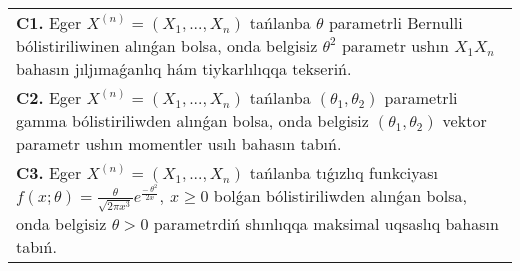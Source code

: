 \documentclass{article}
\begin{document}
\begin{tabular}{m{17cm}}
 \\
\textbf{C1.} 
Eger \(X^{(n)} = \left( X_{1},...,X_{n} \right)\) tańlanba \(\theta\) parametrli Bernulli bólistiriliwinen alınǵan bolsa, onda belgisiz \(\theta^{2}\) parametr ushın \(X_{1}X_{n}\) bahasın jıljımaǵanlıq hám tiykarlılıqqa tekseriń.
 \\
\textbf{C2.} 
Eger \(X^{(n)} = \left( X_{1},...,X_{n} \right)\) tańlanba \(\left( \theta_{1},\theta_{2} \right)\) parametrli gamma bólistiriliwden alınǵan bolsa, onda belgisiz \(\left( \theta_{1},\theta_{2} \right)\) vektor parametr ushın momentler usılı bahasın tabıń.
 \\
\textbf{C3.} 
Eger \(X^{(n)} = \left( X_{1},...,X_{n} \right)\) tańlanba tıǵızlıq funkciyası
$f(x;\theta) = \frac{\theta}{\sqrt{2\pi x^{3}}}e^{\frac{- \ \theta^{2}}{2x}},\ x \geq 0$
bolǵan bólistiriliwden alınǵan bolsa, onda belgisiz \(\theta > 0\) parametrdiń shınlıqqa maksimal uqsaslıq bahasın tabıń.
 \\

\end{tabular}
\vspace{1cm}
\end{document}
